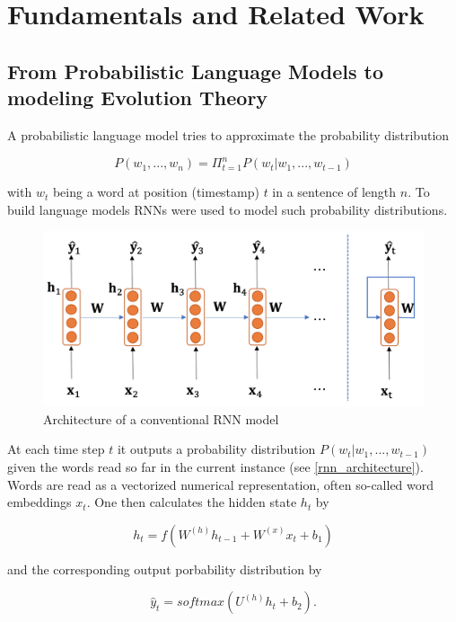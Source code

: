\section{Fundamentals and Related Work} \label{fundamentals}

\subsection{From Probabilistic Language Models to modeling Evolution Theory} \label{fundamentalsA}

A probabilistic language model tries to approximate the probability distribution 

\begin{equation}
	P(w_1, ..., w_n) = \Pi_{t=1}^{n} P(w_t | w_1, ..., w_{t-1})
\end{equation}

with $w_t$ being a word at position (timestamp) $t$ in a sentence of length $n$. To build language models \acp{RNN} were used to model such probability distributions. 

\begin{figure}[ht]
	\centering
	\includegraphics[width=0.8\linewidth]{figures/rnn_architecture.png}
	\caption{Architecture of a conventional \ac{RNN} model \cite{Gertz2020}}
	\label{rnn_architecture}
\end{figure}

At each time step $t$ it outputs a probability distribution $P(w_t | w_1, ..., w_{t-1})$ given the words read so far in the current instance (see \autoref{rnn_architecture}). Words are read as a vectorized numerical representation, often so-called word embeddings $x_t$. One then calculates the hidden state $h_t$ by

\begin{equation}
	h_t = f(W^{(h)} h_{t-1} + W^{(x)} x_t + b_1)
\end{equation}

and the corresponding output porbability distribution by 

\begin{equation}
	\hat{y}_t = softmax(U^{(h)} h_t + b_2).
\end{equation}

